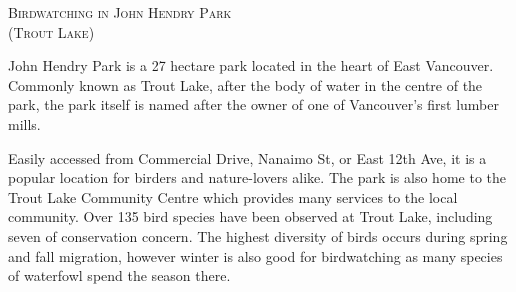 

\begin{center}
\textsc{\LARGE Birdwatching in John Hendry Park}\\[0.2cm]
\textsc{\Large (Trout Lake)}\\[0.2cm]
\end{center}

\setlength\fboxsep{0pt}
\setlength\fboxrule{1pt}
\begin{figure}[h]
  \centering
\end{figure}

\large
John Hendry Park is a 27 hectare park located in the heart of East Vancouver. 
Commonly known as Trout Lake, after the body of water in the centre of the park, the 
park itself is named after the owner of one of Vancouver's first lumber mills. 

Easily accessed from Commercial Drive, Nanaimo St, or East 12th Ave, it is a popular location 
for birders and nature-lovers alike. The park is also home to the 
Trout Lake Community Centre which provides many services to the local community. 
Over 135 bird species have been observed at Trout Lake, including seven of conservation concern.
The highest diversity of birds occurs during spring and fall migration, however
winter is also good for birdwatching as many species of waterfowl spend the season there.

